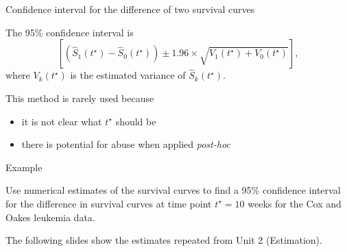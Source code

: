 \documentclass[ignorenonframetext,]{beamer}
\begin{document}
\begin{frame}{%
\protect\hypertarget{confidence-interval-for-the-difference-of-two-survival-curves}{%
Confidence interval for the difference of two survival curves}}

The 95\% confidence interval is \[
\left[ \left ( \widehat S_1(t^\star) - \widehat S_0(t^\star) \right )
\pm 1.96 \times \sqrt{ V_1(t^\star) + V_0 (t^\star) }\right],
\] where \(V_k(t^\star)\) is the estimated variance of
\(\widehat S_k(t^\star).\)

This method is rarely used because

\begin{itemize}
\item
  it is not clear what \(t^\star\) should be
\item
  there is potential for abuse when applied \emph{post-hoc}
\end{itemize}

\end{frame}

\begin{frame}{%
\protect\hypertarget{example}{%
Example}}

Use numerical estimates of the survival curves to find a 95\% confidence
interval for the difference in survival curves at time point
\(t^\star = 10\) weeks for the Cox and Oakes leukemia data.

The following slides show the estimates repeated from Unit 2
(Estimation).

\end{frame}
\end{document}
